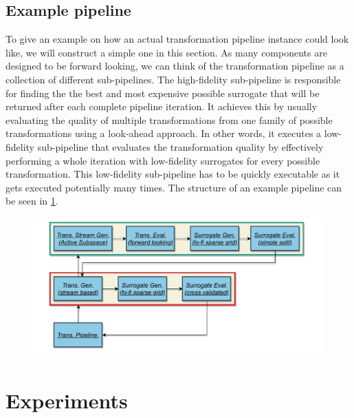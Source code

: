 \documentclass[
  a4paper,  %
  twoside,  %
  bibliography=totoc,
  headsepline,
  cleardoublepage=empty,
  parskip=half,
  draft=false
]{scrbook}
\begin{document}
\newpage
\section{Example pipeline}

To give an example on how an actual transformation pipeline instance could look like, we will construct a simple one in this section.
As many components are designed to be forward looking, we can think of the transformation pipeline as a collection of different sub-pipelines.
The high-fidelity sub-pipeline is responsible for finding the the best and most expensive possible surrogate that will be returned after each complete pipeline iteration.
It achieves this by usually evaluating the quality of multiple transformations from one family of possible transformations using a look-ahead approach.
In other words, it executes a low-fidelity sub-pipeline that evaluates the transformation quality by effectively performing a whole iteration with low-fidelity surrogates for every possible transformation.
This low-fidelity sub-pipeline has to be quickly executable as it gets executed potentially many times.
The structure of an example pipeline can be seen in \cref{fig:tpex}.

\begin{mdframed}[style=style]
\begin{figure}[H]
\includegraphics[width=\textwidth]{graphics/PipelineExample.pdf}
\delimit

\label{fig:tpex}
\end{figure}
\end{mdframed}

\chapter{Experiments}
\label{chap:c7}
\end{document}
